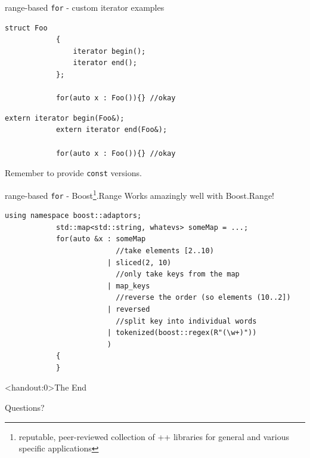	\begin{frame}[fragile]{range-based \lstinline|for| - custom iterator examples}
		\begin{lstlisting}[title=\lstinline|begin()| and \lstinline|end()| as members]
			struct Foo
			{
			    iterator begin();
			    iterator end();
			};
			
			for(auto x : Foo()){} //okay
		\end{lstlisting}
		
		\pause
		
		\begin{lstlisting}[title=\lstinline|begin()| and \lstinline|end()| as free functions]
			extern iterator begin(Foo&);
			extern iterator end(Foo&);
			
			for(auto x : Foo()){} //okay
		\end{lstlisting}
		
		\pause
		
		Remember to provide \lstinline|const| versions.
	\end{frame}
	
	\begin{frame}[fragile=singleslide]{range-based \lstinline|for| - Boost\footnote{reputable, peer-reviewed collection of \C++ libraries for general and various specific applications}.Range}
		Works amazingly well with Boost.Range!
		
		\emptyline
		\begin{lstlisting}[gobble=12]
			using namespace boost::adaptors;
			std::map<std::string, whatevs> someMap = ...;
			for(auto &x : someMap
			              //take elements [2..10)
			            | sliced(2, 10)
			              //only take keys from the map
			            | map_keys
			              //reverse the order (so elements (10..2])
			            | reversed
			              //split key into individual words
			            | tokenized(boost::regex(R"(\w+)"))
			            )
			{
			}
		\end{lstlisting}
	\end{frame}
	
	\begin{frame}<handout:0>{The End}
		\begin{center}
			
			\emptyline
			{\LARGE Questions?}
			
			\emptyline[10]
			
		\end{center}
	\end{frame}

